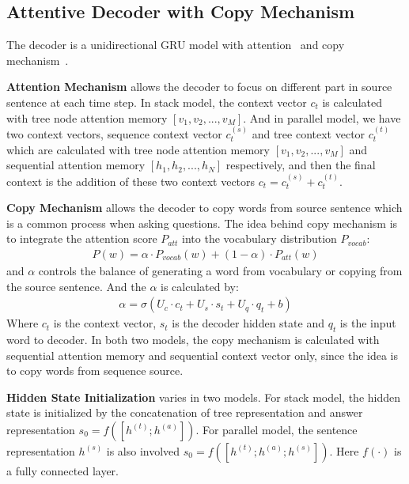 \subsection{Attentive Decoder with Copy Mechanism}
The decoder is a unidirectional GRU model with attention~\cite{bahdanau2014neural} and copy mechanism~\cite{gu2016incorporating,gulcehre2016pointing}.

{\bf Attention Mechanism} allows the decoder to focus on different part in source sentence at each time step. In stack model, the context vector $c_t$ is calculated with tree node attention memory $[v_1,v_2,...,v_M]$. And in parallel model, we have two context vectors, sequence context vector $c^{(s)}_t$ and tree context vector $c^{(t)}_t$ which are calculated with tree node attention memory $[v_1,v_2,...,v_M]$ and sequential attention memory $[h_1,h_2,...,h_N]$ respectively, and then the final context is the addition of these two context vectors $c_t=c^{(s)}_t+c^{(t)}_t$.

{\bf Copy Mechanism} allows the decoder to copy words from source sentence which is a common process when asking questions. The idea behind copy mechanism is to integrate the attention score $P_{att}$ into the vocabulary distribution $P_{vocab}$:
\begin{eqnarray}
P(w) = \alpha \cdot P_{vocab}(w) + (1 - \alpha) \cdot P_{att}(w)
\end{eqnarray}
and $\alpha$ controls the balance of generating a word from vocabulary or copying from the source sentence. And the $\alpha$ is calculated by:
\begin{eqnarray}
\alpha = \sigma(U_c\cdot c_t+U_s\cdot s_t+U_q\cdot q_t + b)
\end{eqnarray}
Where $c_t$ is the context vector, $s_t$ is the decoder hidden state and $q_t$ is the input word to decoder. In both two models, the copy mechanism is calculated with sequential attention memory and sequential context vector only, since the idea is to copy words from sequence source.

{\bf Hidden State Initialization} varies in two models. For stack model, the hidden state is initialized by the concatenation of tree representation and answer representation $s_0=f([h^{(t)}; h^{(a)}])$. For parallel model, the sentence representation $h^{(s)}$ is also involved $s_0=f([h^{(t)}; h^{(a)}; h^{(s)}])$. Here $f(\cdot)$ is a fully connected layer.
